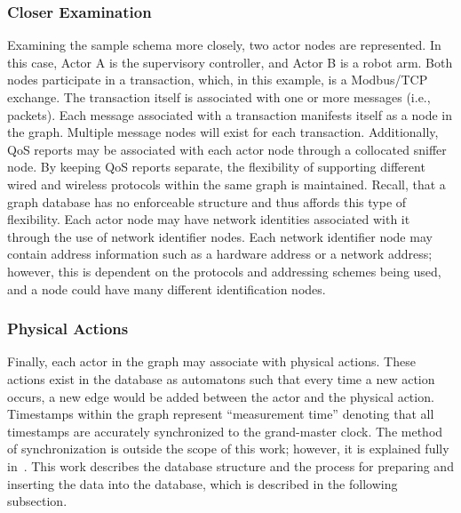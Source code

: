 \subsubsection{Closer Examination}
Examining the sample schema more closely, two actor nodes are represented.  In this case, Actor A is the supervisory controller, and Actor B is a robot arm.  Both nodes participate in a transaction, which, in this example, is a Modbus/TCP exchange. The transaction itself is associated with one or more messages (i.e., packets). Each message associated with a transaction manifests itself as a node in the graph. Multiple message nodes will exist for each transaction. 
Additionally, QoS reports may be associated with each actor node through a collocated sniffer node.  By keeping QoS reports separate, the flexibility of supporting different wired and wireless protocols within the same graph is maintained. Recall, that a graph database has no enforceable structure and thus affords this type of flexibility. Each actor node may have network identities associated with it through the use of network identifier nodes.  Each network identifier node may contain address information such as a hardware address or a network address; however, this is dependent on the protocols and addressing schemes being used, and a node could have many different identification nodes. 
\subsubsection{Physical Actions}
Finally, each actor in the graph may associate with physical actions.  These actions exist in the database as automatons such that every time a new action occurs, a new edge would be added between the actor and the physical action.  Timestamps within the graph represent ``measurement time'' denoting that all  timestamps are accurately synchronized to the grand-master clock.  The method of synchronization is outside the scope of this work; however, it is explained fully in~\cite{Liu2019vancouver}.  This work describes the database structure and the process for preparing and inserting the data into the database, which is described in the following subsection.

